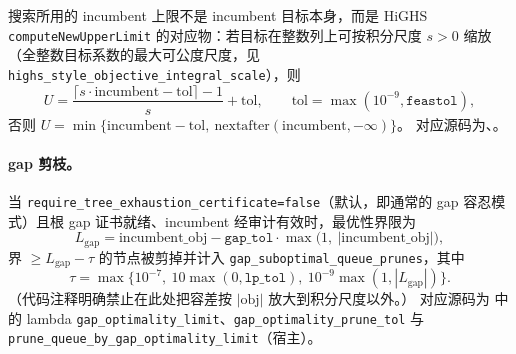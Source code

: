 搜索所用的 incumbent 上限不是 incumbent 目标本身，而是 HiGHS
\texttt{computeNewUpperLimit} 的对应物：若目标在整数列上可按积分尺度
$s>0$ 缩放（全整数目标系数的最大可公度尺度，见
\texttt{highs\_style\_objective\_integral\_scale}），则
\begin{equation}
  U=\frac{\lceil s\cdot\mathrm{incumbent}-\mathrm{tol}\rceil-1}{s}+\mathrm{tol},
  \qquad \mathrm{tol}=\max(10^{-9},\texttt{feastol}),
\end{equation}
否则 $U=\min\{\mathrm{incumbent}-\mathrm{tol},\
\mathrm{nextafter}(\mathrm{incumbent},-\infty)\}$。
对应源码为、。

\paragraph{gap 剪枝。}
当 \texttt{require\_tree\_exhaustion\_certificate=false}（默认，即通常的
gap 容忍模式）且根 gap 证书就绪、incumbent 经审计有效时，最优性界限为
\begin{equation}
  L_{\mathrm{gap}}=\mathrm{incumbent\_obj}
  -\texttt{gap\_tol}\cdot\max\bigl(1,\ |\mathrm{incumbent\_obj}|\bigr),
\end{equation}
界 $\ge L_{\mathrm{gap}}-\tau$ 的节点被剪掉并计入
\texttt{gap\_suboptimal\_queue\_prunes}，其中
\begin{equation}
  \tau=\max\bigl\{10^{-7},\ 10\max(0,\texttt{lp\_tol}),\
  10^{-9}\max(1,|L_{\mathrm{gap}}|)\bigr\}.
\end{equation}
（代码注释明确禁止在此处把容差按 $|\mathrm{obj}|$ 放大到积分尺度以外。）
对应源码为
中的 lambda \texttt{gap\_optimality\_limit}、\texttt{gap\_optimality\_prune\_tol} 与
\texttt{prune\_queue\_by\_gap\_optimality\_limit}（宿主）。

